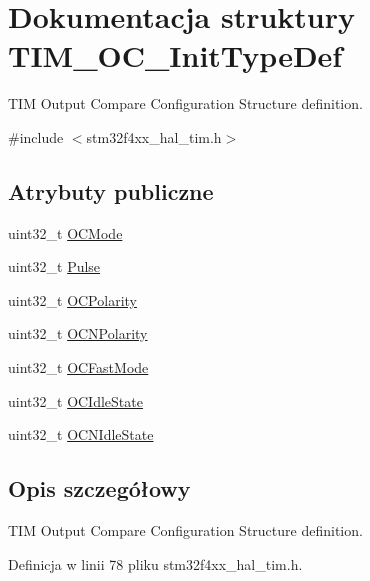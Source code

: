 \hypertarget{struct_t_i_m___o_c___init_type_def}{}\section{Dokumentacja struktury T\+I\+M\+\_\+\+O\+C\+\_\+\+Init\+Type\+Def}
\label{struct_t_i_m___o_c___init_type_def}


T\+IM Output Compare Configuration Structure definition.  




{\ttfamily \#include $<$stm32f4xx\+\_\+hal\+\_\+tim.\+h$>$}

\subsection*{Atrybuty publiczne}
\begin{DoxyCompactItemize}
\item 
uint32\+\_\+t \hyperlink{struct_t_i_m___o_c___init_type_def_ae5faa1cba0b3f1ab6179cc54e1015ee8}{O\+C\+Mode}
\item 
uint32\+\_\+t \hyperlink{struct_t_i_m___o_c___init_type_def_a61fb5b9ef4154de67620ac81085a0e39}{Pulse}
\item 
uint32\+\_\+t \hyperlink{struct_t_i_m___o_c___init_type_def_a556b7137d041aceed3e45c87cbfb39cd}{O\+C\+Polarity}
\item 
uint32\+\_\+t \hyperlink{struct_t_i_m___o_c___init_type_def_a21922d8e2fee659d081c4be4c500d1d4}{O\+C\+N\+Polarity}
\item 
uint32\+\_\+t \hyperlink{struct_t_i_m___o_c___init_type_def_a4c4203c5ed779ac86fb793bb9d628e55}{O\+C\+Fast\+Mode}
\item 
uint32\+\_\+t \hyperlink{struct_t_i_m___o_c___init_type_def_ace3e2b76ca2fca0f4961585ed9ebecf5}{O\+C\+Idle\+State}
\item 
uint32\+\_\+t \hyperlink{struct_t_i_m___o_c___init_type_def_a0d70cc51990d7433fd76cc6ed1d06237}{O\+C\+N\+Idle\+State}
\end{DoxyCompactItemize}


\subsection{Opis szczegółowy}
T\+IM Output Compare Configuration Structure definition. 

Definicja w linii 78 pliku stm32f4xx\+\_\+hal\+\_\+tim.\+h.



